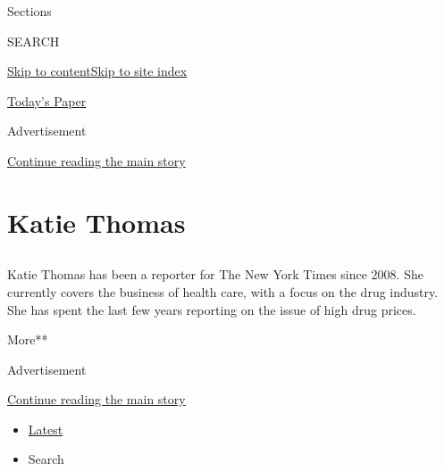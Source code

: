 Sections

SEARCH

\protect\hyperlink{site-content}{Skip to
content}\protect\hyperlink{site-index}{Skip to site index}

\href{https://myaccount.nytimes.com/auth/login?response_type=cookie\&client_id=vi}{}

\href{https://www.nytimes.com/section/todayspaper}{Today's Paper}

Advertisement

\protect\hyperlink{after-top}{Continue reading the main story}

\hypertarget{katie-thomas}{%
\section{Katie Thomas}\label{katie-thomas}}

\subsection{}

Katie Thomas has been a reporter for The New York Times since 2008. She
currently covers the business of health care, with a focus on the drug
industry. She has spent the last few years reporting on the issue of
high drug prices.

More**

Advertisement

\protect\hyperlink{after-mid1}{Continue reading the main story}

\begin{itemize}
\tightlist
\item
  \protect\hyperlink{stream-panel}{Latest}
\item
  Search
\end{itemize}

